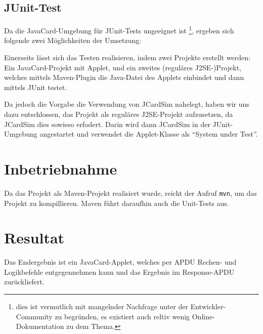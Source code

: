 \documentclass[paper=a4, fontsize=11pt]{scrartcl}
\begin{document}
\subsection{JUnit-Test}
Da die JavaCard-Umgebung für JUnit-Tests ungeeignet ist \footnote{dies ist vermutlich mit mangelnder Nachfrage unter der Entwickler-Community zu begründen, es existiert auch reltiv wenig Online-Dokumentation zu dem Thema.}, ergeben sich folgende zwei Möglichkeiten der Umsetzung:

Einerseits lässt sich das Testen realisieren, indem zwei Projekte erstellt werden: Ein JavaCard-Projekt mit Applet, und ein zweites (reguläres J2SE-)Projekt, welches mittels Maven-Plugin die Java-Datei des Applets einbindet und dann mittels JUnit testet.

Da jedoch die Vorgabe die Verwendung von JCardSim nahelegt, haben wir uns dazu entschlossen, das Projekt als reguläres J2SE-Projekt aufzusetzen, da JCardSim dies sowieso erfodert. Darin wird dann JCardSim in der JUnit-Umgebung angestartet und verwendet die Applet-Klasse als \enquote{System under Test}.

\section{Inbetriebnahme}

Da das Projekt als Maven-Projekt realisiert wurde, reicht der Aufruf \texttt{mvn}, um das Projekt zu kompillieren. Maven führt daraufhin auch die Unit-Tests aus.

\section{Resultat}
Das Endergebnis ist ein JavaCard-Applet, welches per APDU Rechen- und Logikbefehle entgegennehmen kann und das Ergebnis im Response-APDU zurückliefert.
\end{document}
